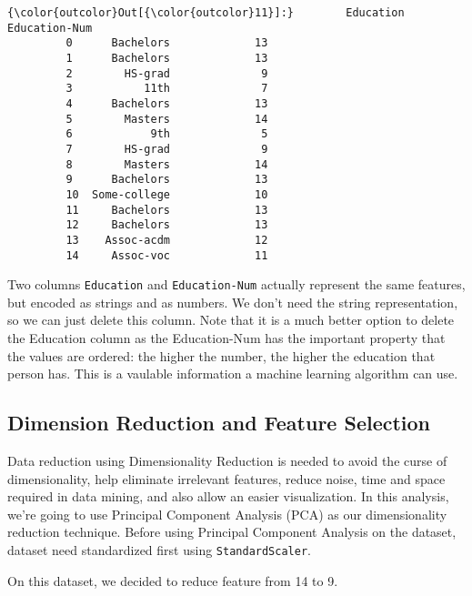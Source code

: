 \documentclass[11pt]{article}
\begin{document}
\begin{Verbatim}[commandchars=\\\{\}]
{\color{outcolor}Out[{\color{outcolor}11}]:}        Education  Education-Num
         0      Bachelors             13
         1      Bachelors             13
         2        HS-grad              9
         3           11th              7
         4      Bachelors             13
         5        Masters             14
         6            9th              5
         7        HS-grad              9
         8        Masters             14
         9      Bachelors             13
         10  Some-college             10
         11     Bachelors             13
         12     Bachelors             13
         13    Assoc-acdm             12
         14     Assoc-voc             11
\end{Verbatim}
            
    Two columns \texttt{Education} and \texttt{Education-Num} actually
represent the same features, but encoded as strings and as numbers. We
don't need the string representation, so we can just delete this column.
Note that it is a much better option to delete the Education column as
the Education-Num has the important property that the values are
ordered: the higher the number, the higher the education that person
has. This is a vaulable information a machine learning algorithm can
use.

    \subsection{Dimension Reduction and Feature
Selection}\label{dimension-reduction-and-feature-selection}

Data reduction using Dimensionality Reduction is needed to avoid the
curse of dimensionality, help eliminate irrelevant features, reduce
noise, time and space required in data mining, and also allow an easier
visualization. In this analysis, we're going to use Principal Component
Analysis (PCA) as our dimensionality reduction technique. Before using
Principal Component Analysis on the dataset, dataset need standardized
first using \texttt{StandardScaler}.

On this dataset, we decided to reduce feature from 14 to 9.
\end{document}
